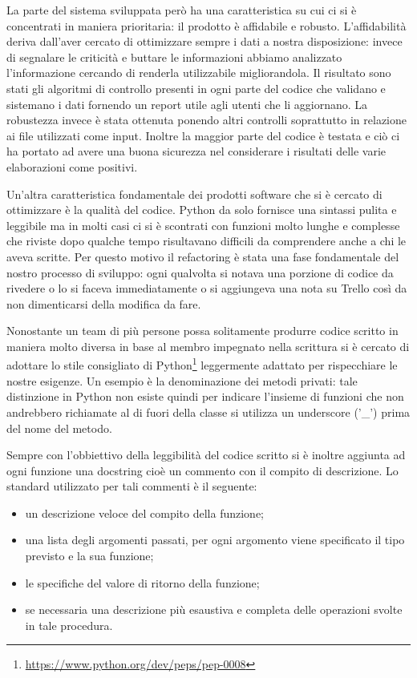\documentclass[12pt]{report}
\begin{document}
\newpage

La parte del sistema sviluppata però ha una caratteristica su cui ci si è concentrati in maniera prioritaria: il prodotto è affidabile e robusto.
L'affidabilità deriva dall'aver cercato di ottimizzare sempre i dati a nostra disposizione: invece di segnalare le criticità e buttare le informazioni abbiamo analizzato l'informazione cercando di renderla utilizzabile migliorandola.
Il risultato sono stati gli algoritmi di controllo presenti in ogni parte del codice che validano e sistemano i dati fornendo un report utile agli utenti che li aggiornano.
La robustezza invece è stata ottenuta ponendo altri controlli soprattutto in relazione ai file utilizzati come input.  
Inoltre la maggior parte del codice è testata e ciò ci ha portato ad avere una buona sicurezza nel considerare i risultati delle varie elaborazioni come positivi.

\vspace{5mm} %

Un'altra caratteristica fondamentale dei prodotti software che si è cercato di ottimizzare è la qualità del codice.
Python da solo fornisce una sintassi pulita e leggibile ma in molti casi ci si è scontrati con funzioni molto lunghe e complesse che riviste dopo qualche tempo risultavano difficili da comprendere anche a chi le aveva scritte.
Per questo motivo il refactoring è stata una fase fondamentale del nostro processo di sviluppo: ogni qualvolta si notava una porzione di codice da rivedere o lo si faceva immediatamente o si aggiungeva una nota su Trello così da non dimenticarsi della modifica da fare.

Nonostante un team di più persone possa solitamente produrre codice scritto in maniera molto diversa in base al membro impegnato nella scrittura si è cercato di adottare lo stile consigliato di Python\footnote{\url{https://www.python.org/dev/peps/pep-0008}} leggermente adattato per rispecchiare le nostre esigenze.
Un esempio è la denominazione dei metodi privati: tale distinzione in Python non esiste quindi per indicare l'insieme di funzioni che non andrebbero richiamate al di fuori della classe si utilizza un underscore ('\_') prima del nome del metodo.

Sempre con l'obbiettivo della leggibilità del codice scritto si è inoltre aggiunta ad ogni funzione una docstring cioè un commento con il compito di descrizione.
Lo standard utilizzato per tali commenti è il seguente:
\begin{itemize}
\item un descrizione veloce del compito della funzione;
\item una lista degli argomenti passati, per ogni argomento viene specificato il tipo previsto e la sua funzione;
\item le specifiche del valore di ritorno della funzione;
\item se necessaria una descrizione più esaustiva e completa delle operazioni svolte in tale procedura. 
\end{itemize}
\end{document}
